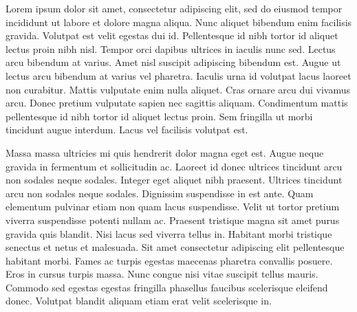 Lorem ipsum dolor sit amet, consectetur adipiscing elit, sed do eiusmod tempor incididunt ut labore et dolore magna aliqua. Nunc aliquet bibendum enim facilisis gravida. Volutpat est velit egestas dui id. Pellentesque id nibh tortor id aliquet lectus proin nibh nisl. Tempor orci dapibus ultrices in iaculis nunc sed. Lectus arcu bibendum at varius. Amet nisl suscipit adipiscing bibendum est. Augue ut lectus arcu bibendum at varius vel pharetra. Iaculis urna id volutpat lacus laoreet non curabitur. Mattis vulputate enim nulla aliquet. Cras ornare arcu dui vivamus arcu. Donec pretium vulputate sapien nec sagittis aliquam. Condimentum mattis pellentesque id nibh tortor id aliquet lectus proin. Sem fringilla ut morbi tincidunt augue interdum. Lacus vel facilisis volutpat est.

Massa massa ultricies mi quis hendrerit dolor magna eget est. Augue neque gravida in fermentum et sollicitudin ac. Laoreet id donec ultrices tincidunt arcu non sodales neque sodales. Integer eget aliquet nibh praesent. Ultrices tincidunt arcu non sodales neque sodales. Dignissim suspendisse in est ante. Quam elementum pulvinar etiam non quam lacus suspendisse. Velit ut tortor pretium viverra suspendisse potenti nullam ac. Praesent tristique magna sit amet purus gravida quis blandit. Nisi lacus sed viverra tellus in. Habitant morbi tristique senectus et netus et malesuada. Sit amet consectetur adipiscing elit pellentesque habitant morbi. Fames ac turpis egestas maecenas pharetra convallis posuere. Eros in cursus turpis massa. Nunc congue nisi vitae suscipit tellus mauris. Commodo sed egestas egestas fringilla phasellus faucibus scelerisque eleifend donec. Volutpat blandit aliquam etiam erat velit scelerisque in.